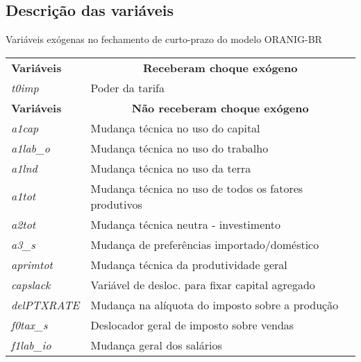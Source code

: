 

\begin{apendicesenv}

	\chapter{Descrição das variáveis} \label{ap:a}

	\begin{quadro}[h]
		\centering
		\small
		\begin{threeparttable}
			\caption{Variáveis exógenas no fechamento de curto-prazo do modelo ORANIG-BR}
			\begin{tabular}{|ll|}
				\hline
				\multirow{2}{*}{\textbf{Variáveis}} & \multicolumn{1}{c|}{\multirow{2}{*}{\textbf{Receberam choque exógeno}}} \\
				 & \multicolumn{1}{c|}{} \\ \hline
				\textit{t0imp} & Poder da tarifa \\ \hline
				\multirow{2}{*}{\textbf{Variáveis}} & \multicolumn{1}{c|}{\multirow{2}{*}{\textbf{Não receberam choque exógeno}}} \\
				 & \multicolumn{1}{c|}{} \\ \hline
				\textit{a1cap} & Mudança técnica no uso do capital \\
				\textit{a1lab\_o} & Mudança técnica no uso do trabalho \\
				\textit{a1lnd} & Mudança técnica no uso da terra \\
				\textit{a1tot} & Mudança técnica no uso de todos os fatores produtivos \\
				\textit{a2tot} & Mudança técnica neutra - investimento \\
				\textit{a3\_s} & Mudança de preferências importado/doméstico \\
				\textit{aprimtot} & Mudança técnica da produtividade geral \\
				\textit{capslack} & Variável de desloc. para fixar capital agregado \\
				\textit{delPTXRATE} & Mudança na alíquota do imposto sobre a produção \\
				\textit{f0tax\_s} & Deslocador geral de imposto sobre vendas \\
				\textit{f1lab\_io} & Mudança geral dos salários \\

\end{tabular}
\end{threeparttable}
\end{quadro}
\end{apendicesenv}
